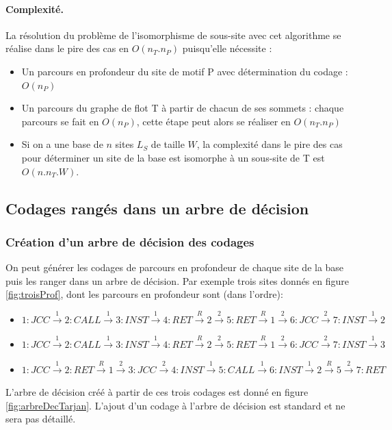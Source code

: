 \paragraph{Complexité.}
La résolution du problème de l'isomorphisme de sous-site avec cet algorithme se réalise dans le pire des cas en $O(n_T.n_P)$ puisqu'elle nécessite :
\begin{itemize}
 \item Un parcours en profondeur du site de motif P avec détermination du codage : $O(n_P)$
 \item Un parcours du graphe de flot T à partir de chacun de ses sommets : chaque parcours se fait en $O(n_P)$, cette étape peut alors se réaliser en $O(n_T.n_P)$
 \item Si on a une base de $n$ sites $L_S$ de taille $W$, la complexité dans le pire des cas pour déterminer un site de la base est isomorphe à un sous-site de T est $O(n.n_T.W)$.
\end{itemize}

\subsection{Codages rangés dans un arbre de décision}
\subsubsection{Création d'un arbre de décision des codages}
On peut générer les codages de parcours en profondeur de chaque site de la base puis les ranger dans un arbre de décision. Par exemple trois sites donnés en figure \ref{fig:troisProf}, dont les parcours en profondeur sont (dans l'ordre):
\begin{itemize}
 \item $1: JCC\xrightarrow{1} 2: CALL \xrightarrow{1} 3: INST \xrightarrow{1} 4: RET \xrightarrow{R} 2 \xrightarrow{2} 5: RET \xrightarrow{R} 1 \xrightarrow{2} 6: JCC \xrightarrow{2} 7:INST \xrightarrow{1} 2$
 \item $1: JCC\xrightarrow{1} 2: CALL \xrightarrow{1} 3: INST \xrightarrow{1} 4: RET \xrightarrow{R} 2 \xrightarrow{2} 5: RET \xrightarrow{R} 1 \xrightarrow{2} 6: JCC \xrightarrow{2} 7:INST \xrightarrow{1} 3$
 \item $1: JCC\xrightarrow{1} 2: RET \xrightarrow{R} 1 \xrightarrow{2} 3: JCC \xrightarrow{2} 4: INST \xrightarrow{1} 5: CALL \xrightarrow{1} 6: INST \xrightarrow{1} 2 \xrightarrow{R} 5 \xrightarrow{2} 7: RET$
\end{itemize}
L'arbre de décision créé à partir de ces trois codages est donné en figure \ref{fig:arbreDecTarjan}. L'ajout d'un codage à l'arbre de décision est standard et ne sera pas détaillé.

